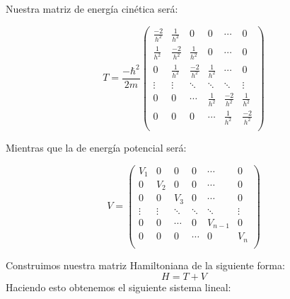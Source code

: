 \documentclass[12pt]{article}
\begin{document}
Nuestra matriz de energía cinética será:

\begin{equation*}
T=\frac{-\hbar^2}{2m} \left(
\begin{matrix}
\frac{-2}{h^2} & \frac{1}{h^2} & 0 & 0 &  \cdots & 0 \\
\frac{1}{h^2} & \frac{-2}{h^2} & \frac{1}{h^2} & 0 & \cdots & 0\\
0 & \frac{1}{h^2} & \frac{-2}{h^2} & \frac{1}{h^2} & \cdots & 0\\
\vdots & \vdots&\ddots &\ddots &\ddots& \vdots \\
0 & 0   &\cdots &\frac{1}{h^2}& \frac{-2}{h^2} & \frac{1}{h^2} \\
0 & 0 & 0  &\cdots & \frac{1}{h^2} & \frac{-2}{h^2} \\
\end{matrix}
\right)
\end{equation*}

Mientras que la de energía potencial será:

\begin{equation*}
V= \left(
\begin{matrix}
V_1 & 0 & 0 & 0 &  \cdots & 0 \\
0 & V_2 & 0 & 0 & \cdots & 0\\
0 & 0 & V_3 & 0 & \cdots & 0\\
\vdots & \vdots&\ddots &\ddots &\ddots& \vdots \\
0 & 0   &\cdots &0& V_{n-1} & 0 \\
0 & 0 & 0  &\cdots & 0 & V_{n} \\
\end{matrix}
\right)
\end{equation*}

Construimos nuestra matriz Hamiltoniana de la siguiente forma:
\begin{equation*}
H=T+V
\end{equation*}
Haciendo esto obtenemos el siguiente sistema lineal: \\
\end{document}
